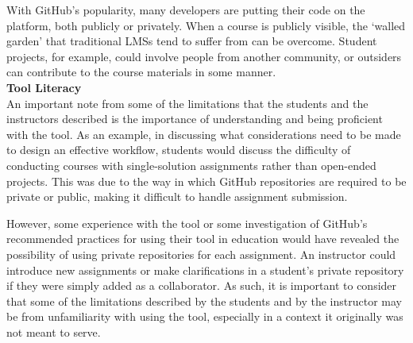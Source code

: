With GitHub's popularity, many developers are putting their code on the platform, both publicly or privately. When a course is publicly visible, the `walled garden' that traditional LMSs tend to suffer from \cite{mott2010envisioning} can be overcome. Student projects, for example, could involve people from another community, or outsiders can contribute to the course materials in some manner. \\

\textbf{Tool Literacy} \\
An important note from some of the limitations that the students and the instructors described is the importance of understanding and being proficient with the tool. As an example, in discussing what considerations need to be made to design an effective workflow, students would discuss the difficulty of conducting courses with single-solution assignments rather than open-ended projects. This was due to the way in which GitHub repositories are required to be private or public, making it difficult to handle assignment submission.

However, some experience with the tool or some investigation of GitHub's recommended practices for using their tool in education would have revealed the possibility of using private repositories for each assignment. An instructor could introduce new assignments or make clarifications in a student's private repository if they were simply added as a collaborator. As such, it is important to consider that some of the limitations described by the students and by the instructor may be from unfamiliarity with using the tool, especially in a context it originally was not meant to serve.




